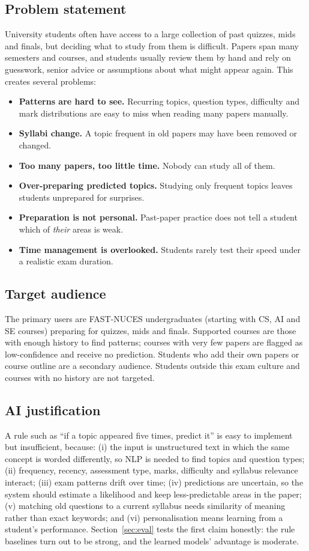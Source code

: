 \documentclass[11pt,a4paper]{article}
\begin{document}
\subsection{Problem statement}
University students often have access to a large collection of past quizzes, mids and finals, but deciding what to study
from them is difficult. Papers span many semesters and courses, and students usually review them by hand and rely on
guesswork, senior advice or assumptions about what might appear again. This creates several problems:
\begin{itemize}
\item \textbf{Patterns are hard to see.} Recurring topics, question types, difficulty and mark distributions are easy to miss
when reading many papers manually.
\item \textbf{Syllabi change.} A topic frequent in old papers may have been removed or changed.
\item \textbf{Too many papers, too little time.} Nobody can study all of them.
\item \textbf{Over-preparing predicted topics.} Studying only frequent topics leaves students unprepared for surprises.
\item \textbf{Preparation is not personal.} Past-paper practice does not tell a student which of \emph{their} areas is weak.
\item \textbf{Time management is overlooked.} Students rarely test their speed under a realistic exam duration.
\end{itemize}

\subsection{Target audience}
The primary users are FAST-NUCES undergraduates (starting with CS, AI and SE courses) preparing for quizzes, mids and
finals. Supported courses are those with enough history to find patterns; courses with very few papers are flagged as
low-confidence and receive no prediction. Students who add their own papers or course outline are a secondary audience.
Students outside this exam culture and courses with no history are not targeted.

\subsection{AI justification}
\label{sec:ai}
A rule such as ``if a topic appeared five times, predict it'' is easy to implement but insufficient, because:
(i) the input is unstructured text in which the same concept is worded differently, so NLP is needed to find topics and
question types; (ii) frequency, recency, assessment type, marks, difficulty and syllabus relevance interact;
(iii) exam patterns drift over time; (iv) predictions are uncertain, so the system should estimate a likelihood and keep
less-predictable areas in the paper; (v) matching old questions to a current syllabus needs similarity of meaning rather
than exact keywords; and (vi) personalisation means learning from a student's performance. Section~\ref{sec:eval} tests the
first claim honestly: the rule baselines turn out to be strong, and the learned models' advantage is moderate.
\end{document}
